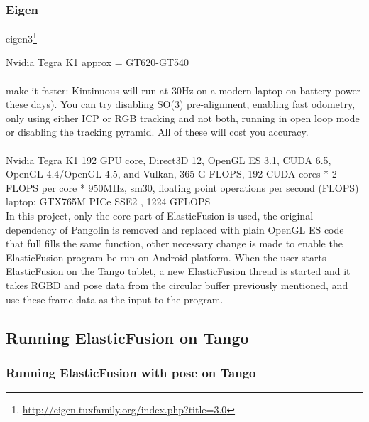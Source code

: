 \documentclass[12pt,twoside]{article}
\begin{document}
\subsubsection{Eigen}

eigen3\footnote{\url{http://eigen.tuxfamily.org/index.php?title=3.0}} 

Nvidia Tegra K1  approx = GT620-GT540\\
\\
make it faster: Kintinuous will run at 30Hz on a modern laptop on battery power these days). You can try disabling SO(3) pre-alignment, enabling fast odometry, only using either ICP or RGB tracking and not both, running in open loop mode or disabling the tracking pyramid. All of these will cost you accuracy.\\
\\
Nvidia Tegra K1  192  GPU core, Direct3D 12, OpenGL ES 3.1, CUDA 6.5, OpenGL 4.4/OpenGL 4.5, and Vulkan, 365 G FLOPS, 192 CUDA cores * 2 FLOPS per core * 950MHz, sm30, floating point operations per second (FLOPS)\\
laptop: GTX765M PICe SSE2 , 1224 GFLOPS\\ 
In this project, only the core part of ElasticFusion is used, the original dependency of Pangolin is removed and replaced with plain OpenGL ES code that full fills the same function, other necessary change is made to enable the ElasticFusion program be run on Android platform. When the user starts ElasticFusion on the Tango tablet, a new ElasticFusion thread is started and it takes RGBD and pose data from the circular buffer previously mentioned, and use these frame data as the input to the program.\\


\newpage



\subsection{Running ElasticFusion on Tango}










\subsubsection{Running ElasticFusion with pose on Tango}
\end{document}
